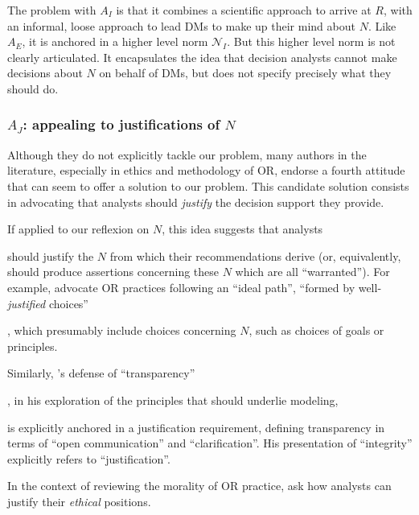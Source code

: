 \documentclass[preprint, french, english, 11pt, authoryear]{elsarticle}%
\newcommand{\protectforpdf}[1]{\texorpdfstring{\ensuremath{#1}}{#1}}
\newcommand{\possessivecite}[1]{\citeauthor{#1}’s \citeyearpar{#1}}
\begin{document}
The problem with $A_I$ is that it combines a scientific approach to arrive at $R$, with an informal, loose approach to lead \acp{DM}
 to make up their mind about $N$.
Like $A_E$, it is anchored in a higher level norm $\mathscr{N}_I$. But this higher level norm is not clearly articulated. It encapsulates the idea that decision analysts cannot make decisions about $N$ on behalf of \acp{DM}, but does not specify precisely what they should do.



\subsubsection{\texorpdfstring{$A_J$}{AJ}: appealing to justifications of \protectforpdf{N}}



Although they do not explicitly tackle our problem, many authors in the literature, especially in ethics and methodology of \ac{OR}, endorse a fourth attitude that can seem to offer a solution to our problem. This candidate solution consists in advocating that analysts should \emph{justify} the decision support they provide. \begin{changebar} If applied to our reflexion on $N$, this idea suggests that analysts \end{changebar}should justify the $N$ from which their recommendations derive (or, equivalently, should produce assertions concerning these $N$ which are all ``warranted'').
For example, \citet{lahtinen_why_2017} advocate \ac{OR}
 practices following an ``ideal path'', ``formed by well-\emph{justified} choices''\begin{changebar}, which presumably include choices concerning $N$, such as choices of goals or principles.\end{changebar}
Similarly, \possessivecite{diekmann_moral_2013} defense of ``transparency''\begin{changebar}, in his exploration of the principles that should underlie modeling,\end{changebar} is explicitly anchored in a justification requirement, defining transparency in terms of ``open communication'' and ``clarification''. His presentation of ``integrity'' explicitly refers to ``justification''.
\begin{changebar}In the context of reviewing the morality of OR practice, \citet{ormerod_operational_2013} ask how analysts can justify their \emph{ethical} positions.\end{changebar}
\end{document}
